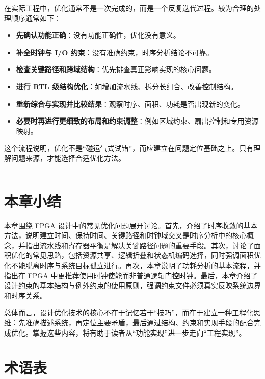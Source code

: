 在实际工程中，优化通常不是一次完成的，而是一个反复迭代过程。较为合理的处理顺序通常如下：

\begin{itemize}
\tightlist
\item
  \textbf{先确认功能正确}：没有功能正确性，优化没有意义。
\item
  \textbf{补全时钟与 I/O 约束}：没有准确约束，时序分析结论不可靠。
\item
  \textbf{检查关键路径和跨域结构}：优先排查真正影响实现的核心问题。
\item
  \textbf{进行 RTL 级结构优化}：如增加流水线、拆分长组合、改善控制结构。
\item
  \textbf{重新综合与实现并比较结果}：观察时序、面积、功耗是否出现新的变化。
\item
  \textbf{必要时再进行更细致的布局和约束调整}：例如区域约束、扇出控制和专用资源映射。
\end{itemize}

这个流程说明，优化不是``碰运气式试错''，而应建立在问题定位基础之上。只有理解问题来源，才能选择合适优化方法。

\begin{center}\rule{0.5\linewidth}{0.5pt}\end{center}

\section{本章小结}\label{ux672cux7ae0ux5c0fux7ed3}

本章围绕 FPGA
设计中的常见优化问题展开讨论。首先，介绍了时序收敛的基本方法，说明建立时间、保持时间、关键路径和时钟域交叉是时序分析中的核心概念，并指出流水线和寄存器平衡是解决关键路径问题的重要手段。其次，讨论了面积优化的常见思路，包括资源共享、逻辑折叠和状态机编码选择，同时强调面积优化不能脱离时序与系统目标孤立进行。再次，本章说明了功耗分析的基本流程，并指出在
FPGA
中更推荐使用时钟使能而非普通逻辑门控时钟。最后，本章介绍了设计约束的基本结构与例外约束的使用原则，强调约束文件必须真实反映系统边界和时序关系。

总体而言，设计优化技术的核心不在于记忆若干``技巧''，而在于建立一种工程化思维：先准确描述系统，再定位主要矛盾，最后通过结构、约束和实现手段的配合完成优化。掌握这些内容，将有助于读者从``功能实现''进一步走向``工程实现''。

\section{术语表}\label{ux672fux8bedux8868}

